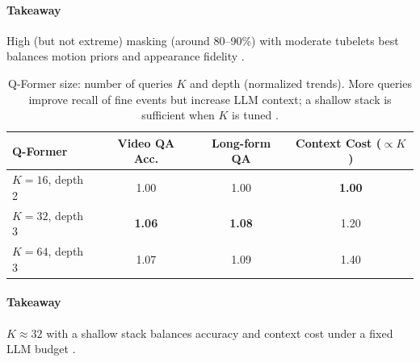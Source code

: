 \begin{enrichment}
\begin{enrichment}
        \paragraph{Takeaway}
        High (but not extreme) masking (around 80–90\%) with moderate tubelets best balances motion priors and appearance fidelity \cite{wang2024_internvideo2}.
        
        \begin{table}[H]
            \centering
            \caption{Q-Former size: number of queries \(K\) and depth (normalized trends). More queries improve recall of fine events but increase LLM context; a shallow stack is sufficient when \(K\) is tuned \cite{wang2024_internvideo2}.}
            \label{tab:chapter24_iv2_qformer_size}
            \begin{tabular}{lccc}
                \toprule
                \textbf{Q-Former} & \textbf{Video QA Acc.} & \textbf{Long-form QA} & \textbf{Context Cost (\(\propto K\))} \\
                \midrule
                \(K{=}16\), depth 2 & 1.00 & 1.00 & \textbf{1.00} \\
                \(K{=}32\), depth 3 & \textbf{1.06} & \textbf{1.08} & 1.20 \\
                \(K{=}64\), depth 3 & 1.07 & 1.09 & 1.40 \\
                \bottomrule
            \end{tabular}
        \end{table}
        
        \paragraph{Takeaway}
        \(K{\approx}32\) with a shallow stack balances accuracy and context cost under a fixed LLM budget \cite{wang2024_internvideo2}.
        

\end{enrichment}
\end{enrichment}

